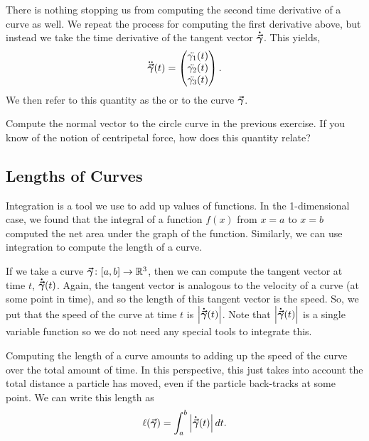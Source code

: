         There is nothing stopping us from computing the second time derivative of a curve as well.  We repeat the process for computing the first derivative above, but instead we take the time derivative of the tangent vector $\boldsymbol{\dot{\vec{\gamma}}}$.  This yields,
                \[
                \boldsymbol{\ddot{\vec{\gamma}}}(t) = \begin{pmatrix} \ddot{\gamma_1}(t) \\ \ddot{\gamma_2}(t) \\ \ddot{\gamma_3}(t) \end{pmatrix}.
                \]
         We then refer to this quantity as the   or   to the curve $\boldsymbol{\vec{\gamma}}$. 
         
         \begin{exercise}
         	Compute the normal vector to the circle curve in the previous exercise.  If you know of the notion of centripetal force, how does this quantity relate?
         \end{exercise}
         
         \subsection{Lengths of Curves}
        
        Integration is a tool we use to add up values of functions.  In the 1-dimensional case, we found that the integral of a function $f(x)$ from $x=a$ to $x=b$ computed the net area under the graph of the function.  Similarly, we can use integration to compute the length of a curve.
        
        If we take a curve $\boldsymbol{\vec{\gamma}} \colon [a,b] \to \mathbb{R}^3$, then we can compute the tangent vector at time $t$, $\boldsymbol{\dot{\vec{\gamma}}}(t)$. Again, the tangent vector is analogous to the velocity of a curve (at some point in time), and so the length of this tangent vector is the speed.  So, we put that the speed of the curve at time $t$ is $\left| \boldsymbol{\dot{\vec{\gamma}}}(t)\right|$. Note that $\left| \boldsymbol{\dot{\vec{\gamma}}}(t) \right|$ is a single variable function so we do not need any special tools to integrate this.
        
        Computing the length of a curve amounts to adding up the speed of the curve over the total amount of time.  In this perspective, this just takes into account the total distance a particle has moved, even if the particle back-tracks at some point. We can write this length as
        \[
        \ell(\boldsymbol{\vec{\gamma}}) = \int_a^b \left|\boldsymbol{\dot{\vec{\gamma}}}(t)\right|dt.
        \]
        
